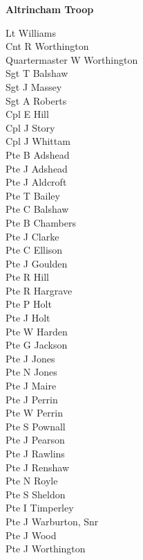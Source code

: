 \vspace*{10mm}

\begin{center}
  \Large
  \textbf{Altrincham Troop}
\end{center}

\begin{multicols}{3}
  \small
  \noindent
  Lt Williams \\
  Cnt R Worthington \\
  Quartermaster W Worthington \\
  Sgt T Balshaw \\
  Sgt J Massey \\
  Sgt A Roberts \\
  Cpl E Hill \\
  Cpl J Story \\
  Cpl J Whittam \\
  Pte B Adshead \\
  Pte J Adshead \\
  Pte J Aldcroft \\
  Pte T Bailey \\
  Pte C Balshaw \\
  Pte B Chambers \\
  Pte J Clarke \\
  Pte C Ellison \\
  Pte J Goulden \\
  Pte R Hill \\
  Pte R Hargrave \\
  Pte P Holt \\
  Pte J Holt \\
  Pte W Harden \\
  Pte G Jackson \\
  Pte J Jones \\
  Pte N Jones \\
  Pte J Maire \\
  Pte J Perrin \\
  Pte W Perrin \\
  Pte S Pownall \\
  Pte J Pearson \\
  Pte J Rawlins \\
  Pte J Renshaw \\
  Pte N Royle \\
  Pte S Sheldon \\
  Pte I Timperley \\
  Pte J Warburton, Snr \\
  Pte J Wood \\
  Pte J Worthington \\
\end{multicols}

